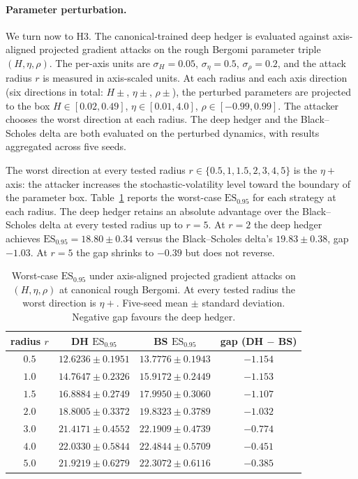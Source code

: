 \documentclass[12pt,a4paper]{article}
\theoremstyle{definition}
\theoremstyle{plain}
\theoremstyle{remark}
\theoremstyle{plain}
\begin{document}
\paragraph{Parameter perturbation.}

We turn now to H3. The canonical-trained deep hedger is evaluated
against axis-aligned projected gradient attacks on the rough Bergomi
parameter triple $(H, \eta, \rho)$. The per-axis units are
$\sigma_H = 0.05$, $\sigma_\eta = 0.5$, $\sigma_\rho = 0.2$, and the
attack radius $r$ is measured in axis-scaled units. At each radius and
each axis direction (six directions in total: $H \pm$, $\eta \pm$,
$\rho \pm$), the perturbed parameters are projected to the box
$H \in [0.02, 0.49]$, $\eta \in [0.01, 4.0]$, $\rho \in [-0.99, 0.99]$.
The attacker chooses the worst direction at each radius. The deep
hedger and the Black--Scholes delta are both evaluated on the
perturbed dynamics, with results aggregated across five seeds.

The worst direction at every tested radius $r \in \{0.5, 1, 1.5, 2, 3,
4, 5\}$ is the $\eta+$ axis: the attacker increases the
stochastic-volatility level toward the boundary of the parameter box.
Table~\ref{tab:6_3_5_radius} reports the worst-case $\mathrm{ES}_{0.95}$
for each strategy at each radius. The deep hedger retains an absolute
advantage over the Black--Scholes delta at every tested radius up to
$r = 5$. At $r = 2$ the deep hedger achieves $\mathrm{ES}_{0.95} =
18.80 \pm 0.34$ versus the Black--Scholes delta's $19.83 \pm 0.38$,
gap $-1.03$. At $r = 5$ the gap shrinks to $-0.39$ but does not
reverse.

\begin{table}[H]
\centering
\caption{Worst-case $\mathrm{ES}_{0.95}$ under axis-aligned projected
gradient attacks on $(H, \eta, \rho)$ at canonical rough Bergomi. At
every tested radius the worst direction is $\eta+$. Five-seed mean
$\pm$ standard deviation. Negative gap favours the deep hedger.}
\label{tab:6_3_5_radius}
\begin{tabular}{c c c c}
\toprule
radius $r$ & DH $\mathrm{ES}_{0.95}$ & BS $\mathrm{ES}_{0.95}$ & gap (DH $-$ BS) \\
\midrule
$0.5$ & $12.6236 \pm 0.1951$ & $13.7776 \pm 0.1943$ & $-1.154$ \\
$1.0$ & $14.7647 \pm 0.2326$ & $15.9172 \pm 0.2449$ & $-1.153$ \\
$1.5$ & $16.8884 \pm 0.2749$ & $17.9950 \pm 0.3060$ & $-1.107$ \\
$2.0$ & $18.8005 \pm 0.3372$ & $19.8323 \pm 0.3789$ & $-1.032$ \\
$3.0$ & $21.4171 \pm 0.4552$ & $22.1909 \pm 0.4739$ & $-0.774$ \\
$4.0$ & $22.0330 \pm 0.5844$ & $22.4844 \pm 0.5709$ & $-0.451$ \\
$5.0$ & $21.9219 \pm 0.6279$ & $22.3072 \pm 0.6116$ & $-0.385$ \\
\bottomrule
\end{tabular}
\end{table}
\end{document}
